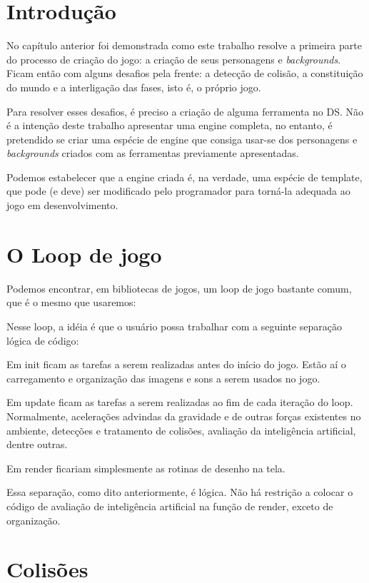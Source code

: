 \documentclass[brazil]{abnt}
\begin{document}
\section{Introdução}

No capítulo anterior foi demonstrada como este trabalho resolve a primeira parte do processo de criação do jogo: a criação de seus personagens e \textit{backgrounds}. Ficam então com alguns desafios pela frente: a detecção de colisão, a constituição do mundo e a interligação das fases, isto é, o próprio jogo.

Para resolver esses desafios, é preciso a criação de alguma ferramenta no DS. Não é a intenção deste trabalho apresentar uma engine completa, no entanto, é pretendido se criar uma espécie de engine que consiga usar-se dos personagens e \textit{backgrounds} criados com as ferramentas previamente apresentadas.

Podemos estabelecer que a engine criada é, na verdade, uma espécie de template, que pode (e deve) ser modificado pelo programador para torná-la adequada ao jogo em desenvolvimento.

\section{O Loop de jogo}

Podemos encontrar, em bibliotecas de jogos, um loop de jogo bastante comum, que é o mesmo que usaremos:



Nesse loop, a idéia é que o usuário possa trabalhar com a seguinte separação lógica de código:

Em init ficam as tarefas a serem realizadas antes do início do jogo. Estão aí o carregamento e organização das imagens e sons a serem usados no jogo. 

Em update ficam as tarefas a serem realizadas ao fim de cada iteração do loop. Normalmente, acelerações advindas da gravidade e de outras forças existentes no ambiente, detecções e tratamento de colisões, avaliação da inteligência artificial, dentre outras.

Em render ficariam simplesmente as rotinas de desenho na tela.

Essa separação, como dito anteriormente, é lógica. Não há restrição a colocar o código de avaliação de inteligência artificial na função de render, exceto de organização.

\section{Colisões}
\end{document}
